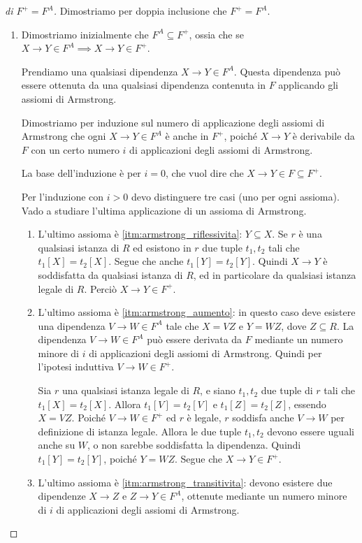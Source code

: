 \begin{proof}[di $F^+ = F^A$]
Dimostriamo per doppia inclusione che $F^+ = F^A$.
\begin{enumerate}
    \item Dimostriamo inizialmente che $F^A \subseteq F^+$, ossia che se $X \to Y \in F^A \implies X \to Y \in F^+$.

    Prendiamo una qualsiasi dipendenza $X \to Y \in F^A$. Questa dipendenza pu\`o essere ottenuta da una qualsiasi dipendenza contenuta in $F$ applicando gli assiomi di Armstrong. 

    Dimostriamo per induzione sul numero di applicazione degli assiomi di Armstrong che ogni $X \to Y \in F^A$ \`e anche in $F^+$, poich\'e $X \to Y$ \`e derivabile da $F$ con un certo numero $i$ di applicazioni degli assiomi di Armstrong.
      
    La base dell'induzione \`e per $i = 0$, che vuol dire che $X \to Y \in F \subseteq F^+$.

    Per l'induzione con $i > 0$ devo distinguere tre casi (uno per ogni assioma). Vado a studiare l'ultima applicazione di un assioma di Armstrong.
    \begin{enumerate}
        \item L'ultimo assioma \`e \ref{itm:armstrong_riflessivita}: $Y \subseteq X$. Se $r$ \`e una qualsiasi istanza di $R$ ed esistono in $r$ due tuple $t_1, t_2$ tali che $t_1[X] = t_2[X]$. Segue che anche $t_1[Y] = t_2[Y]$. Quindi $X \to Y$ \`e soddisfatta da qualsiasi istanza di $R$, ed in particolare da qualsiasi istanza legale di $R$. Perci\`o $X \to Y \in F^+$.
        \item L'ultimo assioma \`e \ref{itm:armstrong_aumento}: in questo caso deve esistere una dipendenza $V \to W \in F^A$ tale che $X = VZ$ e $Y = WZ$, dove $Z \subseteq R$. La dipendenza $V \to W \in F^A$ pu\`o essere derivata da $F$ mediante un numero minore di $i$ di applicazioni degli assiomi di Armstrong. Quindi per l'ipotesi induttiva $V \to W \in F^+$. 

        Sia $r$ una qualsiasi istanza legale di $R$, e siano $t_1, t_2$ due tuple di $r$ tali che $t_1[X] = t_2[X]$. Allora $t_1[V] = t_2[V]$ e $t_1[Z] = t_2[Z]$, essendo $X = VZ$. Poich\'e $V \to W \in F^+$ ed $r$ \`e legale, $r$ soddisfa anche $V \to W$ per definizione di istanza legale. Allora le due tuple $t_1, t_2$ devono essere uguali anche su $W$, o non sarebbe soddisfatta la dipendenza. Quindi $t_1[Y] = t_2[Y]$, poich\'e $Y = WZ$. Segue che $X \to Y \in F^+$.
        \item L'ultimo assioma \`e \ref{itm:armstrong_transitivita}: devono esistere due dipendenze $X \to Z$ e $Z \to Y \in F^{A}$, ottenute mediante un numero minore di $i$ di applicazioni degli assiomi di Armstrong.


\end{enumerate}
\end{enumerate}
\end{proof}

